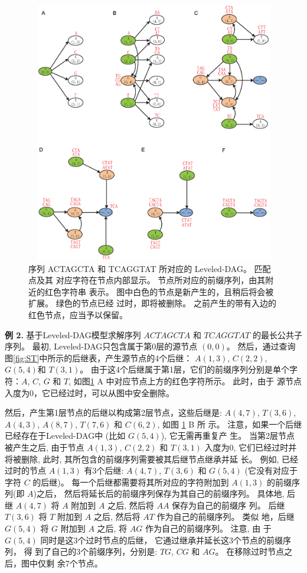 \begin{figure}[!h]
  \centering
  \includegraphics[height=4.5in,
  width=4.5in]{figures/4_MLCS/Level_DAG}
  \vspace{1.5em}
  \caption{序列 ACTAGCTA 和 TCAGGTAT 所对应的 Leveled-DAG。 匹配点及其
    对应字符在节点内部显示。 节点所对应的前缀序列，由其附近的红色字符串
    表示。 图中白色的节点是新产生的，且稍后将会被扩展。 绿色的节点已经
    过时，即将被删除。 之前产生的带有入边的红色节点，应当予以保留。}
  \label{fig:Leveled-DAG}
\end{figure}

\textbf{例 2.} 基于Leveled-DAG模型求解序列 $ACTAGCTA$ 和 $TCAGGTAT$ 的最长公共子
序列。 最初, Leveled-DAG只包含属于第0层的源节点 $(0, 0)$。 然后，通过查询
图\ref{fig:ST}中所示的后继表，产生源节点的4个后继： $A(1, 3)$, $C(2, 2)$, $G(5,
4)$和 $T(3, 1)$。 由于这4个后继属于第1层，它们的前缀序列分别是单个字符：$A$, $C$,
$G$ 和 $T$, 如图\ref{fig:Leveled-DAG} A 中对应节点上方的红色字符所示。 此时，由于
源节点入度为0，它已经过时，可以从图中安全删除。

然后，产生第1层节点的后继以构成第2层节点，这些后继是: $A(4, 7)$, $T(3, 6)$,
$A(4, 3)$, $A(8, 7)$, $T(7, 6)$ 和 $C(6, 2)$, 如图 \ref{fig:Leveled-DAG} B 所
示。 注意，如果一个后继已经存在于Leveled-DAG中 (比如 $G(5, 4)$), 它无需再重复产
生。 当第2层节点被产生之后, 由于节点 $A(1, 3)$, $C(2, 2)$ 和 $T(3, 1)$ 入度为0,
它们已经过时并将被删除, 此时, 其所包含的前缀序列需要被其后继节点继承并延
长。 例如, 已经过时的节点 $A(1, 3)$ 有3个后继: $A(4, 7)$, $T(3, 6)$ 和 $G(5, 4)$
(它没有对应于字符 $C$ 的后继)。 每一个后继都需要将其所对应的字符附加到 $A(1, 3)$
的前缀序列(即 $A$)之后， 然后将延长后的前缀序列保存为其自己的前缀序列。 具体地,
后继 $A(4, 7)$ 将 $A$ 附加到 $A$ 之后, 然后将 $AA$ 保存为自己的前缀序
列。 后继 $T(3, 6)$ 将 $T$ 附加到 $A$ 之后, 然后将 $AT$ 作为自己的前缀序列。 类似
地，后继 $G(5, 4)$ 将 $G$ 附加到 $A$ 之后, 将 $AG$ 作为自己的前缀序列。 注意, 由
于 $G(5, 4)$ 同时是这3个过时节点的后继， 它通过继承并延长这3个节点的前缀序列， 得
到了自己的3个前缀序列，分别是: $TG$, $CG$ 和 $AG$。 在移除过时节点之后，图中仅剩
余7个节点。

